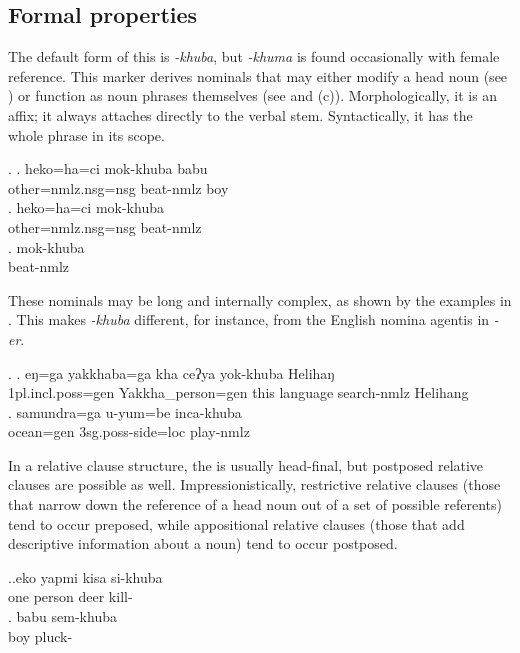 \subsection{Formal properties}

The default form of this  is \emph{-khuba}, but \emph{-khuma} is found occasionally with female reference. This marker derives nominals that may either modify a head noun (see \Next[a]) or function as noun phrases themselves (see \Next[b] and (c)). Morphologically, it is an affix; it always attaches directly to the verbal stem. Syntactically, it has the whole phrase  in its scope.

\ex. \ag.   heko=ha=ci mok-khuba babu\\
			other{\sc =nmlz.nsg=nsg} beat{\sc -nmlz} boy\\
			\bg. heko=ha=ci mok-khuba \\
			other{\sc =nmlz.nsg=nsg} beat{\sc -nmlz} \\
			\bg. mok-khuba\\
			beat{\sc -nmlz}\\
	
These nominals may be long and internally complex, as shown by the examples in \Next. This makes \emph{-khuba} different, for instance, from the English nomina agentis in \emph{-er}.
	
\ex. \ag.	eŋ=ga yakkhaba=ga kha  ceʔya   yok-khuba Helihaŋ\\
		{\sc 1pl.incl.poss=gen} Yakkha\_person{\sc =gen} this language  search{\sc -nmlz}	Helihang	\\ 
		 
		\bg. samundra=ga    u-yum=be            inca-khuba\\
		ocean{\sc =gen} {\sc 3sg.poss}-side{\sc =loc} play{\sc -nmlz}\\
		 
		
In a relative clause structure, the  is usually head-final, but postposed relative clauses are possible as well. Impressionistically, restrictive relative clauses (those that narrow down the reference of a head noun out of a set of possible referents) tend to occur  preposed, while appositional relative clauses (those that add descriptive information about a noun) tend to occur postposed. 
	
	\ex.\ag.eko yapmi kisa si-khuba\\
	one person deer kill-\\
	\bg. babu sem-khuba\\
	boy pluck-\\
	

